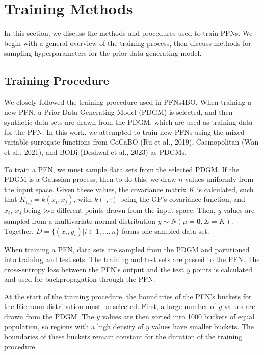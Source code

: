 \documentclass[12pt,twoside]{reedthesis}
\begin{document}
\hypertarget{methods1}{%
\chapter{Training Methods}\label{methods1}}

In this section, we discuss the methods and procedures used to train PFNs. We begin with a general overview of the training process, then discuss methods for sampling hyperparameters for the prior-data generating model.

\hypertarget{trainingProcedure}{%
\section{Training Procedure}\label{trainingProcedure}}

We closely followed the training procedure used in PFNs4BO. When training a new PFN, a Prior-Data Generating Model (PDGM) is selected, and then synthetic data sets are drawn from the PDGM, which are used as training data for the PFN. In this work, we attempted to train new PFNs using the mixed variable surrogate functions from CoCaBO (Ru et al., 2019), Casmopolitan (Wan et al., 2021), and BODi (Deshwal et al., 2023) as PDGMs.

To train a PFN, we must sample data sets from the selected PDGM. If the PDGM is a Gaussian process, then to do this, we draw \(n\) values uniformly from the input space. Given these values, the covariance matrix \(K\) is calculated, such that \(K_{i,j}=k(x_i,x_j)\), with \(k(\cdot,\cdot)\) being the GP's covariance function, and \(x_i,\ x_j\) being two different points drawn from the input space. Then, \(y\) values are sampled from a multivariate normal distribution \(y\sim N(\mu=\textbf{0}, \Sigma=K)\). Together, \(D=\{(x_i,y_i)|i\in1,...,n\}\) forms one sampled data set.

When training a PFN, data sets are sampled from the PDGM and partitioned into training and test sets. The training and test sets are passed to the PFN. The cross-entropy loss between the PFN's output and the test \(y\) points is calculated and used for backpropagation through the PFN.

At the start of the training procedure, the boundaries of the PFN's buckets for the Riemann distribution must be selected. First, a large number of \(y\) values are drawn from the PDGM. The \(y\) values are then sorted into 1000 buckets of equal population, so regions with a high density of \(y\) values have smaller buckets. The boundaries of these buckets remain constant for the duration of the training procedure.
\end{document}
